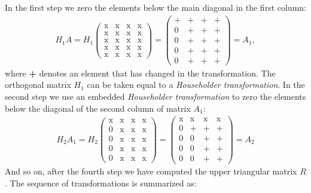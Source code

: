 In the first step we zero the elements below the main diagonal in the first column:
\begin{align*}
    H_1A = H_1\begin{pmatrix}\text{x} & \text{x} & \text{x} & \text{x} \\ \text{x} & \text{x} & \text{x} & \text{x} \\ \text{x} & \text{x} & \text{x} & \text{x} \\ \text{x} & \text{x} & \text{x} & \text{x} \\ \text{x} & \text{x} & \text{x} & \text{x}\end{pmatrix} = \begin{pmatrix}\text{+} & \text{+} & \text{+} & \text{+} \\ 0 & \text{+} & \text{+} & \text{+} \\ 0 & \text{+} & \text{+} & \text{+} \\ 0 & \text{+} & \text{+} & \text{+} \\ 0 & \text{+} & \text{+} & \text{+}\end{pmatrix} = A_1,
\end{align*}
where \textbf{+} denotes an element that has changed in the transformation. The orthogonal matrix $H_1$ can be taken equal to a \textit{Householder transformation}. In the second step we use an embedded \textit{Householder transformation} to zero the elements below the diagonal of the second column of matrix $A_1$:
\begin{align*}
    H_2A_1 = H_2\begin{pmatrix}\text{x} & \text{x} & \text{x} & \text{x} \\ 0 & \text{x} & \text{x} & \text{x} \\ 0 & \text{x} & \text{x} & \text{x} \\ 0 & \text{x} & \text{x} & \text{x} \\ 0 & \text{x} & \text{x} & \text{x}\end{pmatrix} = \begin{pmatrix}\text{x} & \text{x} & \text{x} & \text{x} \\ 0 & \text{+} & \text{+} & \text{+} \\ 0 & 0 & \text{+} & \text{+} \\ 0 & 0 & \text{+} & \text{+} \\ 0 & 0 & \text{+} & \text{+}\end{pmatrix} = A_2
\end{align*}
And so on, after the fourth step we have computed the upper triangular matrix $R$. The sequence of transformations is summarized as:
